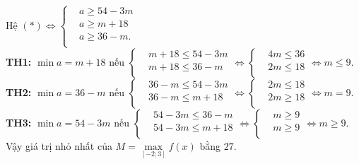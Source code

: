 \begin{ex}
{		Hệ $\left( * \right)\Leftrightarrow \left\{ \begin{aligned}
			& a\ge 54-3m \\
			& a\ge m+18 \\
			& a\ge 36-m. \\
		\end{aligned} \right.$\\
		\textbf{TH1:} $\min a=m+18$ nếu $\left\{ \begin{aligned}
			& m+18\le 54-3m \\
			& m+18\le 36-m \\
		\end{aligned} \right.\Leftrightarrow \left\{ \begin{aligned}
			& 4m\le 36 \\
			& 2m\le 18 \\
		\end{aligned} \right.\Leftrightarrow m\le 9$.\\
		\textbf{TH2:} $\min a=36-m$ nếu $\left\{ \begin{aligned}
			& 36-m\le 54-3m \\
			& 36-m\le m+18 \\
		\end{aligned} \right.\Leftrightarrow \left\{ \begin{aligned}
			& 2m\le 18 \\
			& 2m\ge 18 \\
		\end{aligned} \right.\Leftrightarrow m=9$.\\
		\textbf{TH3:} $\min a=54-3m$ nếu $\left\{ \begin{aligned}
			& 54-3m\le 36-m \\
			& 54-3m\le m+18 \\
		\end{aligned} \right.\Leftrightarrow \left\{ \begin{aligned}
			& m\ge 9 \\
			& m\ge 9 \\
		\end{aligned} \right.\Leftrightarrow m\ge 9$.\\
		Vậy giá trị nhỏ nhất của $M=\max\limits_{[-2;3]} f(x)$ bằng $27$.\\
	}
\end{ex}

